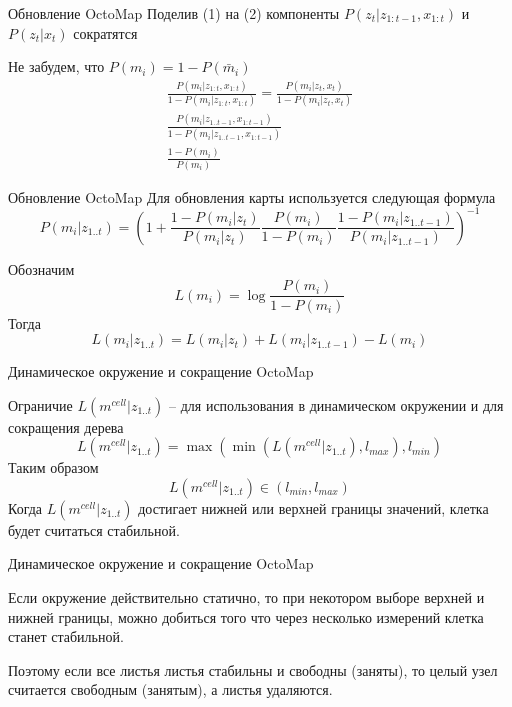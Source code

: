 \documentclass[9pt]{beamer}
\begin{document}
\begin{frame}{Обновление OctoMap}
Поделив (1) на (2) компоненты $P(z_t|z_{1:t-1}, x_{1:t})$ и $P(z_t|x_{t})$ сократятся

Не забудем, что $P(m_i) = 1 - P(\bar m_i)$
\begin{equation}
\begin{split}
\frac{P(m_i | z_{1:t}, x_{1:t})}{1 - P(m_i | z_{1:t}, x_{1:t})} = 
\frac{P(m_i | z_t, x_t)}{1- P(m_i | z_t, x_t)}\\
\frac{P(m_i | z_{1..t-1}, x_{1:t-1})}{1- P(m_i | z_{1..t-1}, x_{1:t-1})}\\
\frac{1 - P(m_i)}{P(m_{i})}
\end{split}
\end{equation}

\end{frame}


\begin{frame}{Обновление OctoMap}
  Для обновления карты используется следующая формула
  $$P(m_{i}| z_{1..t}) = \left(1 + \frac{1- P(m_i | z_{t})}{P(m_{i} | z_{t})}  \frac{P(m_{i})}{1 - P(m_i)} 
   \frac{1- P(m_i | z_{1..t-1})} {P(m_i | z_{1..t-1})}\right)^{-1}$$

  Обозначим 
  $$L(m_i)= \log{ \frac{P(m_i)}{1 - P(m_i)} }$$
  Тогда
  $$L(m_i| z_{1..t})= L(m_i | z_t) + L(m_i | z_{1..t-1}) - L(m_i)$$

\end{frame}

\begin{frame}{Динамическое окружение и сокращение OctoMap}

    Ограничие $L(m^{cell}| z_{1..t})$ -- для использования в динамическом окружении и для сокращения дерева
    $$L(m^{cell}| z_{1..t}) = \max( \min(L(m^{cell}| z_{1..t}), l_{max}), l_{min})$$
    Таким образом
    $$L(m^{cell}| z_{1..t}) \in (l_{min}, l_{max})$$
    Когда $L(m^{cell}| z_{1..t})$ достигает нижней или верхней границы значений, клетка будет считаться стабильной.

\end{frame}

\begin{frame}{Динамическое окружение и сокращение OctoMap}

    Если окружение действительно статично, то при некотором выборе верхней и нижней границы, можно добиться того что через несколько измерений клетка станет стабильной. 

    Поэтому если все листья листья стабильны и свободны (заняты), то целый узел считается свободным (занятым), а листья удаляются.
    
\end{frame}
\end{document}
